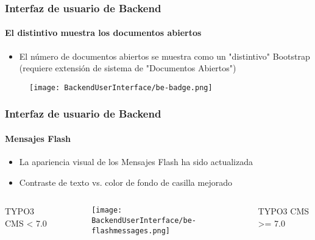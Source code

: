 \begin{frame}[fragile]
	\frametitle{Interfaz de usuario de Backend}
	\framesubtitle{El distintivo muestra los documentos abiertos}

	\begin{itemize}
		\item El número de documentos abiertos se muestra como un "distintivo" Bootstrap
			(requiere extensión de sistema de "Documentos Abiertos")
	\end{itemize}
	\begin{figure}
		\texttt{[image: BackendUserInterface/be-badge.png]}
	\end{figure}

\end{frame}


\begin{frame}[fragile]
	\frametitle{Interfaz de usuario de Backend}
	\framesubtitle{Mensajes Flash}

	\begin{itemize}
		\item La apariencia visual de los Mensajes Flash ha sido actualizada
		\item Contraste de texto vs. color de fondo de casilla mejorado
	\end{itemize}

	\begin{columns}[T]
		\begin{column}{.25\textwidth}
			\smaller\hfill 
				\begingroup\color{typo3red}TYPO3 CMS < 7.0\endgroup
			\normalsize
		\end{column}

		\begin{column}{.5\textwidth}
			\begin{figure}\vspace*{-0.6cm}
				\texttt{[image: BackendUserInterface/be-flashmessages.png]}
			\end{figure}
		\end{column}

		\begin{column}{.25\textwidth}
			\smaller
				\begingroup\color{typo3red}TYPO3 CMS >= 7.0\endgroup
			\normalsize
		\end{column}

	\end{columns}

\end{frame}

